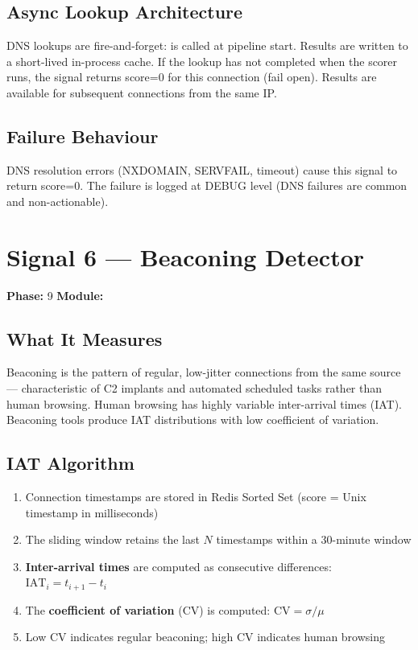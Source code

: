 \subsection{Async Lookup Architecture}

DNS lookups are fire-and-forget:  is called
at pipeline start. Results are written to a short-lived in-process cache. If the lookup
has not completed when the scorer runs, the signal returns score=0 for this connection
(fail open). Results are available for subsequent connections from the same IP.

\subsection{Failure Behaviour}

DNS resolution errors (NXDOMAIN, SERVFAIL, timeout) cause this signal to return score=0.
The failure is logged at DEBUG level (DNS failures are common and non-actionable).

\section{Signal 6 — Beaconing Detector}
\label{sig:beacon}

\textbf{Phase:} 9 \quad \textbf{Module:} 

\subsection{What It Measures}

Beaconing is the pattern of regular, low-jitter connections from the same source —
characteristic of C2 implants and automated scheduled tasks rather than human browsing.
Human browsing has highly variable inter-arrival times (IAT). Beaconing tools produce
IAT distributions with low coefficient of variation.

\subsection{IAT Algorithm}

\begin{enumerate}
  \item Connection timestamps are stored in Redis Sorted Set 
        (score = Unix timestamp in milliseconds)
  \item The sliding window retains the last $N$ timestamps within a 30-minute window
  \item \textbf{Inter-arrival times} are computed as consecutive differences:
        $\text{IAT}_i = t_{i+1} - t_i$
  \item The \textbf{coefficient of variation} (CV) is computed: $\text{CV} = \sigma / \mu$
  \item Low CV indicates regular beaconing; high CV indicates human browsing
\end{enumerate}

